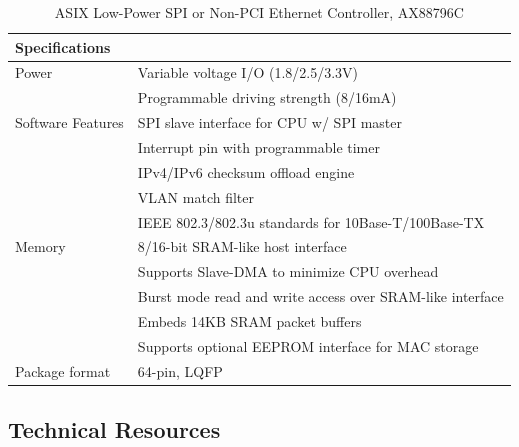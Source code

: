\begin{table}
    \centering
    \label{table:AX88796C}%
    \caption{ASIX Low-Power SPI or Non-PCI Ethernet Controller, AX88796C \autocite{AX88796CPdfAX88796C}}
    \begin{tabular}{|p{4cm}|p{12cm}|}
      \hline\rowcolor{gray!30}

      \textbf{Specifications} &  \\
      \hline
  
      Power & Variable voltage I/O (1.8/2.5/3.3V) \\
      & Programmable driving strength (8/16mA) \\
      \hline

      Software Features & SPI slave interface for CPU w/ SPI master \\
      & Interrupt pin with programmable timer \\
      & IPv4/IPv6 checksum offload engine \\
      & VLAN match filter \\
      & IEEE 802.3/802.3u standards for 10Base-T/100Base-TX \\
      \hline
  
      Memory & 8/16-bit SRAM-like host interface \\
      & Supports Slave-DMA to minimize CPU overhead \\
      & Burst mode read and write access over SRAM-like interface \\
      & Embeds 14KB SRAM packet buffers \\
      & Supports optional EEPROM interface for MAC storage \\
      \hline
   
      Package format & 64-pin, LQFP \\
      \hline
  
    \end{tabular}
\end{table}


\subsection{Technical Resources} \label{technicalresources}




